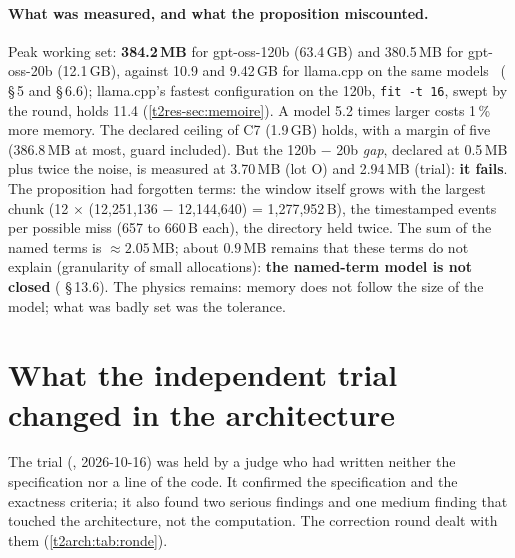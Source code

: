 \paragraph{What was measured, and what the proposition miscounted.} Peak working set: \textbf{384.2\,MB} for gpt-oss-120b (63.4\,GB) and 380.5\,MB for gpt-oss-20b (12.1\,GB), against 10.9 and 9.42\,GB for llama.cpp on the same models \mes~( §\,5 and §\,6.6); llama.cpp's fastest configuration on the 120b, \texttt{fit -t 16}, swept by the round, holds 11.4 (\cref{t2res-sec:memoire}). A model 5.2 times larger costs 1\,\% more memory. The declared ceiling of C7 (1.9\,GB) holds, with a margin of five (386.8\,MB at most, guard included). But the 120b $-$ 20b \emph{gap}, declared at 0.5\,MB plus twice the noise, is measured at 3.70\,MB (lot O) and 2.94\,MB (trial): \textbf{it fails}. The proposition had forgotten terms: the window itself grows with the largest chunk (12 $\times$ (12{,}251{,}136 $-$ 12{,}144{,}640) = 1{,}277{,}952\,B), the timestamped events per possible miss (657 to 660\,B each), the directory held twice. The sum of the named terms is $\approx 2.05$\,MB; about $0.9$\,MB remains that these terms do not explain (granularity of small allocations): \textbf{the named-term model is not closed} ( §\,13.6). The physics remains: memory does not follow the size of the model; what was badly set was the tolerance.

\section{What the independent trial changed in the architecture}\label{t2arch:sec:epreuve}

The trial (, 2026-10-16) was held by a judge who had written neither the specification nor a line of the code. It confirmed the specification and the exactness criteria; it also found two serious findings and one medium finding that touched the architecture, not the computation. The correction round dealt with them (\cref{t2arch:tab:ronde}).

